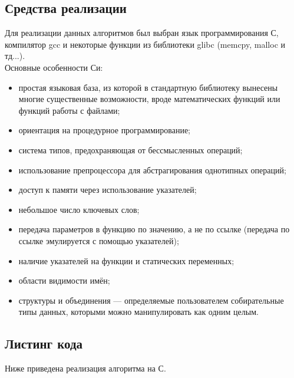 \documentclass[a4paper,12pt]{article}
\begin{document}
\newpage
\subsection{Средства реализации}
Для реализации данных алгоритмов был выбран язык программирования С, компилятор gcc и некоторые функции из библиотеки glibc (memcpy, malloc и тд...). \\
Основные особенности Си: \\
\begin{itemize}
\item простая языковая база, из которой в стандартную библиотеку вынесены многие существенные возможности, вроде математических функций или функций работы с файлами;
\item ориентация на процедурное программирование;
\item система типов, предохраняющая от бессмысленных операций;
\item использование препроцессора для абстрагирования однотипных операций;
\item доступ к памяти через использование указателей;
\item небольшое число ключевых слов;
\item передача параметров в функцию по значению, а не по ссылке (передача по ссылке эмулируется с помощью указателей);
\item наличие указателей на функции и статических переменных;
\item области видимости имён;
\item структуры и объединения — определяемые пользователем собирательные типы данных, которыми можно манипулировать как одним целым.
\end{itemize}


\newpage
\subsection{Листинг кода}
Ниже приведена реализация алгоритма на С.\\



\end{document}
